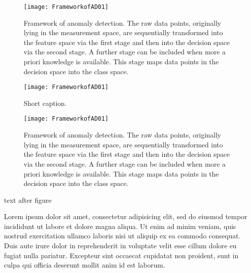 \documentclass[10pt,a4paper,extrafontsizes,oldfontcommands,oneside]{memoir}
\begin{document}
\begin{figure}[!htbp]
\centering{}\texttt{[image: FrameworkofAD01]} \caption{Framework of anomaly detection. The raw data points, originally lying
in the measurement space, are sequentially transformed into the feature
space via the first stage and then into the decision space via the
second stage. A further stage can be included when more a priori knowledge
is available. This stage maps data points in the decision space into
the class space.}
\label{fig:ADFramework}
\end{figure}

\begin{figure}[!htbp]
\centering{}\texttt{[image: FrameworkofAD01]} \caption{Short caption.}
\label{fig:ADFramework1}
\end{figure}

\begin{figure}[!htbp]
\texttt{[image: FrameworkofAD01]} 
\caption{Framework of anomaly detection. The raw data points, originally lying
in the measurement space, are sequentially transformed into the feature
space via the first stage and then into the decision space via the
second stage. A further stage can be included when more a priori knowledge
is available. This stage maps data points in the decision space into
the class space.}
\label{fig:ADFramework2}
\end{figure}
text after figure

Lorem ipsum dolor sit amet, consectetur adipisicing elit, sed do eiusmod tempor incididunt ut labore et dolore magna aliqua. Ut enim ad minim veniam, quis nostrud exercitation ullamco laboris nisi ut aliquip ex ea commodo consequat. Duis aute irure dolor in reprehenderit in voluptate velit esse cillum dolore eu fugiat nulla pariatur. Excepteur sint occaecat cupidatat non proident, sunt in culpa qui officia deserunt mollit anim id est laborum.

\end{document}
